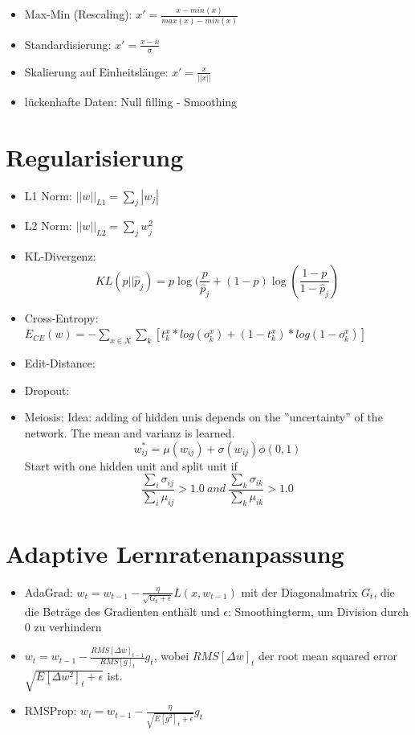 \documentclass[paper=a4, fontsize=11pt]{scrartcl} %
\begin{document}
\begin{itemize}
\item Max-Min (Rescaling): $x' = \frac{x - min(x)}{max(x) - min(x)}$
\item Standardisierung: $x' = \frac{x - \bar{x}}{\sigma}$
\item Skalierung auf Einheitslänge: $x' = \frac{x}{||x||}$
\item lückenhafte Daten: Null filling - Smoothing
\end{itemize}

\section{Regularisierung}

\begin{itemize}
\item L1 Norm: $||w||_{L1} = \sum\limits_j |w_j|$
\item L2 Norm: $||w||_{L2} = \sum\limits_j w^2_j$
\item KL-Divergenz:
\[
KL(p || \widehat{p}_j) = p \log(\frac{p}{\widehat{p}_j} + (1 - p) \log(\frac{1 - p}{1 - \widehat{p}_j})
\]
\item Cross-Entropy: $E_{CE}(w) = - \sum\limits_{x \in X} \sum\limits_k [t^x_k * log(o^x_k) + (1-t^x_k)*log(1-o^x_k)]$
\item Edit-Distance: 
\item Dropout: 
\item Meiosis: Idea: adding of hidden unis depends on the ''uncertainty'' of the network. The mean and varianz is learned.
\[
w_{ij}^{*} = \mu(w_{ij}) + \sigma(w_{ij}) \phi(0, 1)
\]
Start with one hidden unit and split unit if
\[
\frac{\sum_i \sigma_{ij}}{\sum_i \mu_{ij}} > 1.0 \: and \: \frac{\sum_k \sigma_{ik}}{\sum_k \mu_{ik}} > 1.0
\]
\end{itemize}

\section{Adaptive Lernratenanpassung}

\begin{itemize}
\item AdaGrad: $w_t = w_{t-1} - \frac{\eta}{\sqrt{G_t+\epsilon}} L(x,w_{t-1})$ mit der Diagonalmatrix $G_t$, die die Beträge des Gradienten enthält und $\epsilon$: Smoothingterm, um Division durch 0 zu verhindern
\item $w_t = w_{t-1} - \frac{RMS[\Delta w]_{t-1}}{RMS[g]_t}g_t$, wobei $RMS[\Delta w]_t$ der \glqq root mean squared error\grqq\ $\sqrt{E[\Delta w^2]_t + \epsilon}$ ist.
\item RMSProp: $w_t = w_{t-1} - \frac{\eta}{\sqrt{E[g^2]_t + \epsilon}} g_t$
\end{itemize}
\end{document}
